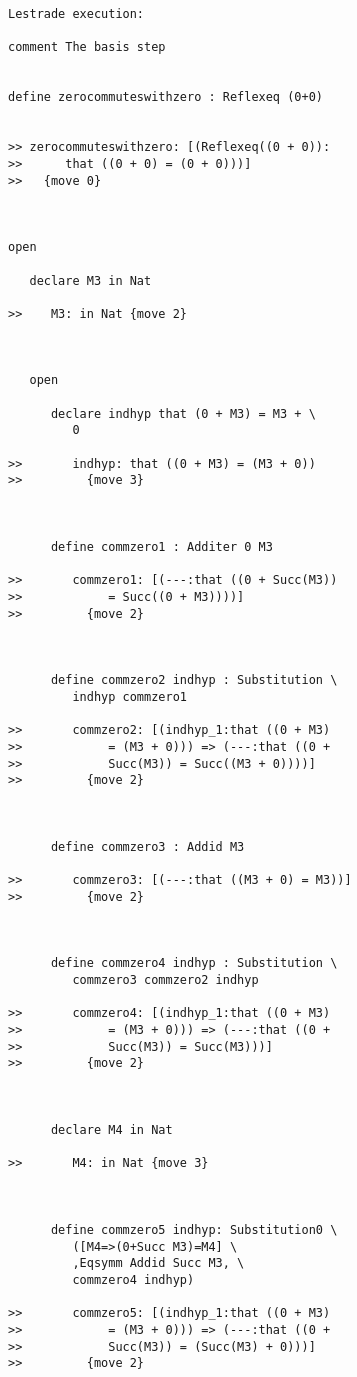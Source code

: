 \documentclass[12pt]{article}
\begin{document}
\begin{verbatim}Lestrade execution:

comment The basis step


define zerocommuteswithzero : Reflexeq (0+0)


>> zerocommuteswithzero: [(Reflexeq((0 + 0)):
>>      that ((0 + 0) = (0 + 0)))]
>>   {move 0}



open

   declare M3 in Nat

>>    M3: in Nat {move 2}



   open

      declare indhyp that (0 + M3) = M3 + \
         0

>>       indhyp: that ((0 + M3) = (M3 + 0))
>>         {move 3}



      define commzero1 : Additer 0 M3

>>       commzero1: [(---:that ((0 + Succ(M3))
>>            = Succ((0 + M3))))]
>>         {move 2}



      define commzero2 indhyp : Substitution \
         indhyp commzero1

>>       commzero2: [(indhyp_1:that ((0 + M3)
>>            = (M3 + 0))) => (---:that ((0 +
>>            Succ(M3)) = Succ((M3 + 0))))]
>>         {move 2}



      define commzero3 : Addid M3

>>       commzero3: [(---:that ((M3 + 0) = M3))]
>>         {move 2}



      define commzero4 indhyp : Substitution \
         commzero3 commzero2 indhyp

>>       commzero4: [(indhyp_1:that ((0 + M3)
>>            = (M3 + 0))) => (---:that ((0 +
>>            Succ(M3)) = Succ(M3)))]
>>         {move 2}



      declare M4 in Nat

>>       M4: in Nat {move 3}



      define commzero5 indhyp: Substitution0 \
         ([M4=>(0+Succ M3)=M4] \
         ,Eqsymm Addid Succ M3, \
         commzero4 indhyp)

>>       commzero5: [(indhyp_1:that ((0 + M3)
>>            = (M3 + 0))) => (---:that ((0 +
>>            Succ(M3)) = (Succ(M3) + 0)))]
>>         {move 2}




\end{verbatim}
\end{document}

